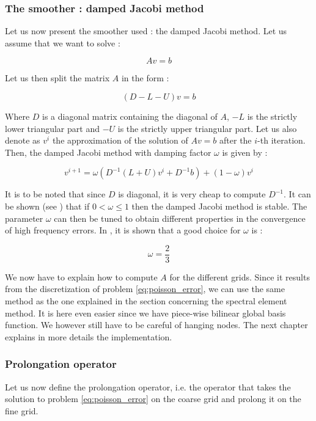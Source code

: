 \subsubsection{The smoother : damped Jacobi method}

Let us now present the smoother used : the damped Jacobi method. Let us assume that we want to solve :

$$Av=b$$

Let us then split the matrix $A$ in the form : 

$$(D-L-U)v = b$$

Where $D$ is a diagonal matrix containing the diagonal of $A$, $-L$ is the strictly lower triangular part and $-U$ is the strictly upper triangular part. Let us also denote as $v^i$ the approximation of the solution of $Av=b$ after the $i$-th iteration. Then, the damped Jacobi method with damping factor $\omega$ is given by : 

$$ v^{i+1} = \omega\left(D^{-1}(L+U)v^i + D^{-1}b\right) + (1-\omega)v^i$$

It is to be noted that since $D$ is diagonal, it is very cheap to compute $D^{-1}$. It can be shown (see \cite{multi_book}) that if $0<\omega\leq 1$ then the damped Jacobi method is stable. The parameter $\omega$ can then be tuned to obtain different properties in the convergence of high frequency errors. In \cite{multi_book}, it is shown that a good choice for $\omega$ is : 

$$\omega = \frac{2}{3}$$

We now have to explain how to compute $A$ for the different grids. Since it results from the discretization of problem \ref{eq:poisson_error}, we can use the same method as the one explained in the section concerning the spectral element method. It is here even easier since we have piece-wise bilinear global basis function. We however still have to be careful of hanging nodes. The next chapter explains in more details the implementation. 

\subsubsection{Prolongation operator}

Let us now define the prolongation operator, i.e. the operator that takes the solution to problem \ref{eq:poisson_error} on the coarse grid and prolong it on the fine grid. 

